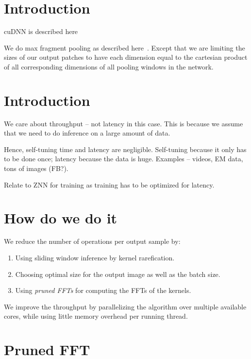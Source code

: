 \documentclass[conference]{IEEEtran}
\begin{document}
\section{Introduction}

cuDNN is described here~\cite{chetlur2014cudnn}

We do max fragment pooling as described here~\cite{giusti2013fast}.
Except that we are limiting the sizes of our output patches to have
each dimension equal to the cartesian product of all corresponding
dimensions of all pooling windows in the network.

\section{Introduction}

We care about throughput -- not latency in this case.  This is because
we assume that we need to do inference on a large amount of data.

Hence, self-tuning time and latency are negligible.  Self-tuning
because it only has to be done once; latency because the data is huge.
Examples -- videos, EM data, tons of images (FB?).

Relate to ZNN for training as training has to be optimized for
latency.

\section{How do we do it}


We reduce the number of operations per output sample by:
\begin{enumerate}
\item Using sliding window inference by kernel rarefication.
\item Choosing optimal size for the output image as well as the batch
  size.
\item Using \emph{pruned FFTs} for computing the FFTs of the kernels.
\end{enumerate}

We improve the throughput by parallelizing the algorithm over multiple
available cores, while using little memory overhead per running
thread.


\section{Pruned FFT}
\end{document}
